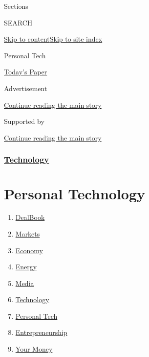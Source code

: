 Sections

SEARCH

\protect\hyperlink{site-content}{Skip to
content}\protect\hyperlink{site-index}{Skip to site index}

\href{https://www.nytimes3xbfgragh.onion/section/technology/personaltech}{Personal
Tech}

\href{https://myaccount.nytimes3xbfgragh.onion/auth/login?response_type=cookie\&client_id=vi}{}

\href{https://www.nytimes3xbfgragh.onion/section/todayspaper}{Today's
Paper}

Advertisement

\protect\hyperlink{after-top}{Continue reading the main story}

Supported by

\protect\hyperlink{after-sponsor}{Continue reading the main story}

\hypertarget{technology}{%
\subsubsection{\texorpdfstring{\href{/section/technology}{Technology}}{Technology}}\label{technology}}

\hypertarget{personal-technology}{%
\section{Personal Technology}\label{personal-technology}}

\begin{enumerate}
\def\labelenumi{\arabic{enumi}.}
\tightlist
\item
  \href{/pages/business/dealbook/index.html}{DealBook}
\item
  \href{https://markets.on.nytimes3xbfgragh.onion}{Markets}
\item
  \href{/section/business/economy}{Economy}
\item
  \href{/section/business/energy-environment}{Energy}
\item
  \href{/section/business/media}{Media}
\item
  \href{/section/technology}{Technology}
\item
  \href{/section/technology/personaltech}{Personal Tech}
\item
  \href{/section/business/smallbusiness}{Entrepreneurship}
\item
  \href{/section/your-money}{Your Money}
\end{enumerate}

